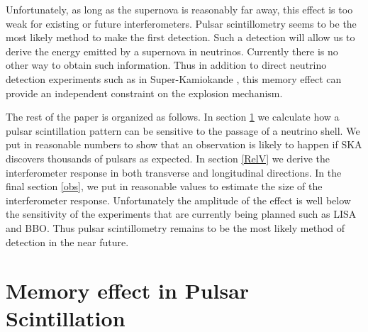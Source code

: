 \documentclass[aps,showpacs,onecolumn,floats,prd,superscriptaddress,nofootinbib]{revtex4-1}
\begin{document}
Unfortunately, as long as the supernova is reasonably far away, this effect is too weak for existing or future interferometers. 
Pulsar scintillometry seems to be the most likely method to make the first detection. 
Such a detection will allow us to derive the energy emitted by a supernova in neutrinos. 
Currently there is no other way to obtain such information. 
Thus in addition to direct neutrino detection experiments such as in Super-Kamiokande \cite{SuperKSN}, this memory effect can provide an independent constraint on the explosion mechanism.


The rest of the paper is organized as follows. 
In section \ref{sec-scint} we calculate how a pulsar scintillation pattern can be sensitive to the passage of a neutrino shell.
We put in reasonable numbers to show that an observation is likely to happen if SKA discovers thousands of pulsars as expected.
In section \ref{RelV} we derive the interferometer response in both transverse and longitudinal directions.  
In the final section \ref{obs}, we put in reasonable values to estimate the size of the interferometer response.
Unfortunately the amplitude of the effect is well below the sensitivity of the experiments that are currently being planned such as LISA and BBO.
Thus pulsar scintillometry remains to be the most likely method of detection in the near future.

\section{Memory effect in Pulsar Scintillation}
\label{sec-scint}
\end{document}

